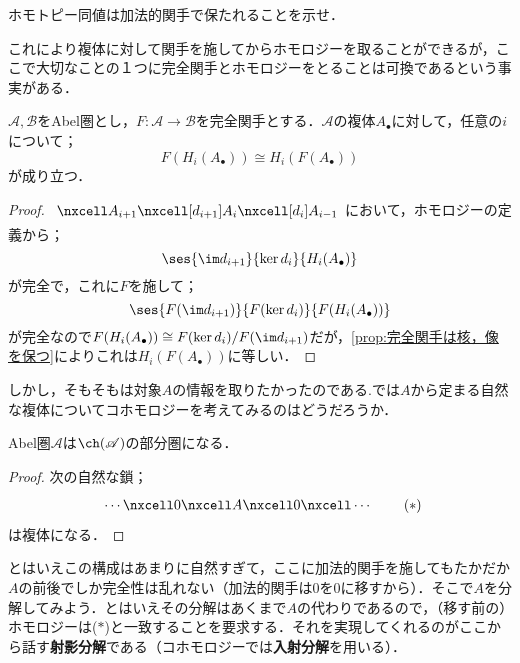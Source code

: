 \begin{exer}
	ホモトピー同値は加法的関手で保たれることを示せ．
\end{exer}

これにより複体に対して関手を施してからホモロジーを取ることができるが，ここで大切なことの１つに完全関手とホモロジーをとることは可換であるという事実がある．

\begin{prop}[FHHF定理]
	$\mathscr{A},\mathscr{B}$をAbel圏とし，$F:\mathscr{A}\to\mathscr{B}$を完全関手とする．$\mathscr{A}$の複体$A_\bullet$に対して，任意の$i$について；
	\[F(H_i(A_\bullet))\cong H_i(F(A_\bullet))\]
	が成り立つ．
\end{prop}

\begin{proof}
	$\begin{tikzcd}
		\nxcell A_{i+1}\nxcell[d_{i+1}]A_i\nxcell[d_i]A_{i-1} 
	\end{tikzcd}$において，ホモロジーの定義から；
	\[\ses{\im d_{i+1}}{\ker d_i}{H_i(A_\bullet)}\]
	が完全で，これに$F$を施して；
	\[\ses{F(\im d_{i+1})}{F(\ker d_i)}{F(H_i(A_\bullet))}\]
	が完全なので$F(H_i(A_\bullet))\cong F(\ker d_{i})/F(\im d_{i+1})$だが，\ref{prop:完全関手は核，像を保つ}によりこれは$H_i(F(A_\bullet))$に等しい．
\end{proof}

しかし，そもそもは対象$A$の情報を取りたかったのである.では$A$から定まる自然な複体についてコホモロジーを考えてみるのはどうだろうか．
\begin{prop}
	Abel圏$\mathscr{A}$は$\ch(\mathscr{A})$の部分圏になる．
\end{prop}
\begin{proof}
	次の自然な鎖；
	\[\begin{tikzcd}
	\cdots\nxcell0\nxcell A\nxcell 0\nxcell\cdots
	\end{tikzcd}\tag{$\ast$}\]
	は複体になる．
\end{proof}

とはいえこの構成はあまりに自然すぎて，ここに加法的関手を施してもたかだか$A$の前後でしか完全性は乱れない（加法的関手は0を0に移すから）．そこで$A$を分解してみよう．とはいえその分解はあくまで$A$の代わりであるので，（移す前の）ホモロジーは($\ast$)と一致することを要求する．それを実現してくれるのがここから話す\textbf{射影分解}である（コホモロジーでは\textbf{入射分解}を用いる）．

